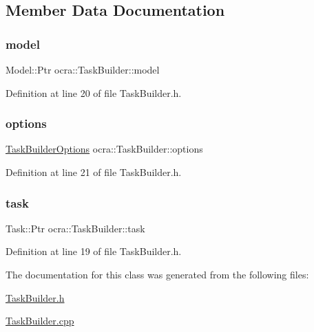 \subsection{Member Data Documentation}
\hypertarget{classocra_1_1TaskBuilder_af612ab3b2881a7d472efabb650b23caf}{}\label{classocra_1_1TaskBuilder_af612ab3b2881a7d472efabb650b23caf} 
\subsubsection{\texorpdfstring{model}{model}}
{\footnotesize\ttfamily Model\+::\+Ptr ocra\+::\+Task\+Builder\+::model\hspace{0.3cm}{\ttfamily [protected]}}



Definition at line 20 of file Task\+Builder.\+h.

\hypertarget{classocra_1_1TaskBuilder_a93ad03ab72579612f7ec5fe57b5df145}{}\label{classocra_1_1TaskBuilder_a93ad03ab72579612f7ec5fe57b5df145} 
\subsubsection{\texorpdfstring{options}{options}}
{\footnotesize\ttfamily \hyperlink{classocra_1_1TaskBuilderOptions}{Task\+Builder\+Options} ocra\+::\+Task\+Builder\+::options\hspace{0.3cm}{\ttfamily [protected]}}



Definition at line 21 of file Task\+Builder.\+h.

\hypertarget{classocra_1_1TaskBuilder_ad3f099d23545d5d55d55ac2cf3d93b4d}{}\label{classocra_1_1TaskBuilder_ad3f099d23545d5d55d55ac2cf3d93b4d} 
\subsubsection{\texorpdfstring{task}{task}}
{\footnotesize\ttfamily Task\+::\+Ptr ocra\+::\+Task\+Builder\+::task\hspace{0.3cm}{\ttfamily [protected]}}



Definition at line 19 of file Task\+Builder.\+h.



The documentation for this class was generated from the following files\+:\begin{DoxyCompactItemize}
\item 
\hyperlink{TaskBuilder_8h}{Task\+Builder.\+h}\item 
\hyperlink{TaskBuilder_8cpp}{Task\+Builder.\+cpp}\end{DoxyCompactItemize}
